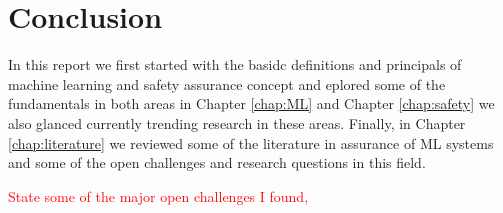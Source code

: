 \chapter{Conclusion}

In this report we first started with the basidc definitions and principals of machine learning and safety assurance concept and eplored some of the fundamentals in both areas in Chapter \ref{chap:ML} and Chapter \ref{chap:safety} we also glanced currently trending research in these areas. Finally, in Chapter \ref{chap:literature} we reviewed some of the literature in assurance of ML systems and some of the open challenges and research questions in this field. 

\textcolor{red}{State some of the major open challenges I found,}